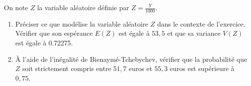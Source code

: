 On note $Z$ la variable aléatoire définie par $Z=\frac{Y}{\num{1000}}$.

\begin{enumerate}[resume]
	\item Préciser ce que modélise la variable aléatoire $Z$ dans le contexte de l'exercice. Vérifier que son espérance $E(Z)$ est égale à $53,5$ et que sa variance $V(Z)$ est égale à \num{0.72275}.
	\item À l'aide de l'inégalité de Bienaymé-Tchebychev, vérifier que la probabilité que $Z$ soit strictement compris entre $51,7$ euros et $55,3$ euros est supérieure à $0,75$.
\end{enumerate}